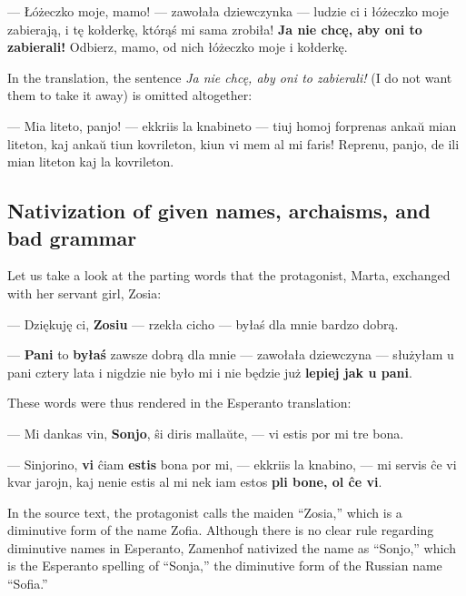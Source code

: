 \begin{displayquote}
--- Łóżeczko moje, mamo! --- zawołała dziewczynka --- ludzie ci i łóżeczko moje zabierają, i tę kołderkę, którąś mi sama zrobiła! \textbf{Ja nie chcę, aby oni to zabierali!} Odbierz, mamo, od nich łóżeczko moje i kołderkę.
\end{displayquote}

In the translation, the sentence \textit{Ja nie chcę, aby oni to zabierali!} (I do not want them to take it away) is omitted altogether:

\begin{displayquote}
--- Mia liteto, panjo! --- ekkriis la knabineto --- tiuj homoj forprenas ankaŭ mian liteton, kaj ankaŭ tiun kovrileton, kiun vi mem al mi faris! Reprenu, panjo, de ili mian liteton kaj la kovrileton.
\end{displayquote}

\subsection{Nativization of given names, archaisms, and bad grammar}

Let us take a look at the parting words that the protagonist, Marta, exchanged with her servant girl, Zosia:

\begin{displayquote}
--- Dziękuję ci, \textbf{Zosiu} --- rzekła cicho --- byłaś dla mnie bardzo dobrą.

--- \textbf{Pani} to \textbf{byłaś} zawsze dobrą dla mnie --- zawołała dziewczyna --- służyłam u pani cztery lata i nigdzie nie było mi i nie będzie już \textbf{lepiej jak u pani}.
\end{displayquote}

These words were thus rendered in the Esperanto translation:

\begin{displayquote}
--- Mi dankas vin, \textbf{Sonjo}, ŝi diris mallaŭte, --- vi estis por mi tre bona.

--- Sinjorino, \textbf{vi} ĉiam \textbf{estis} bona por mi, --- ekkriis la knabino, --- mi servis ĉe vi kvar jarojn, kaj nenie estis al mi nek iam estos \textbf{pli bone, ol ĉe vi}.
\end{displayquote}

In the source text, the protagonist calls the maiden ``Zosia,'' which is a diminutive form of the name Zofia.
Although there is no clear rule regarding diminutive names in Esperanto, Zamenhof nativized the name as ``Sonjo,'' which is the Esperanto spelling of ``Sonja,'' the diminutive form of the Russian name ``Sofia.''

